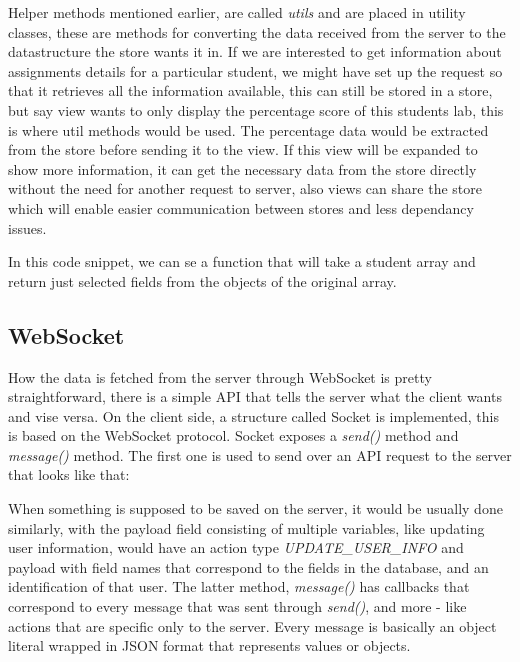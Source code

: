 Helper methods mentioned earlier, are called \emph{utils} and are placed in utility classes, these are methods for converting the data received from the server to the datastructure the store wants it in. If we are interested to get information about assignments details for a particular student, we might have set up the request so that it retrieves all the information available, this can still be stored in a store, but say view wants to only display the percentage score of this students lab, this is where util methods would be used. The percentage data would be extracted from the store before sending it to the view. If this view will be expanded to show more information, it can get the necessary data from the store directly without the need for another request to server, also views can share the store which will enable easier communication between stores and less dependancy issues.

In this code snippet, we can se a function that will take a student array and return just selected fields from the objects of the original array.

\subsection{WebSocket}\label{sec:websocket}
How the data is fetched from the server through WebSocket is pretty straightforward, there is a simple API that tells the server what the client wants and vise versa. On the client side, a structure called Socket is implemented, this is based on the WebSocket protocol. Socket exposes a \emph{send()} method and \emph{message()} method. The first one is used to send over an API request to the server that looks like that:

When something is supposed to be saved on the server, it would be usually done similarly, with the payload field consisting of multiple variables, like updating user information, would have an action type \emph{UPDATE\_USER\_INFO} and payload with field names that correspond to the fields in the database, and an identification of that user. The latter method, \emph{message()} has callbacks that correspond to every message that was sent through \emph{send()}, and more - like actions that are specific only to the server. Every message is basically an object literal wrapped in JSON format that represents values or objects.
